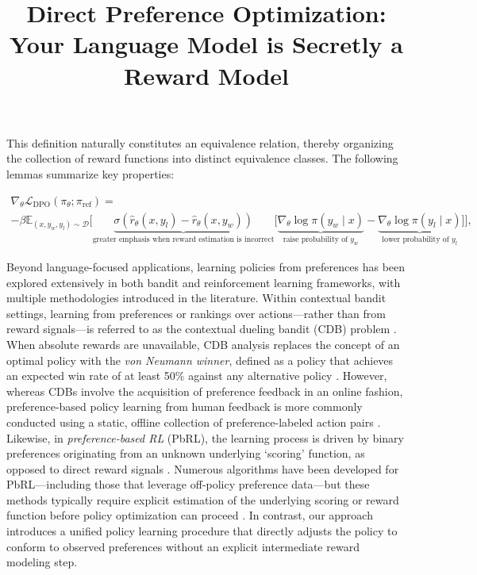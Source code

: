\title{Direct Preference Optimization: Your Language Model is Secretly a Reward Model}
This definition naturally constitutes an equivalence relation, thereby organizing the collection of reward functions into distinct equivalence classes. The following lemmas summarize key properties:

\begin{multline*}\label{eq:gradient}
    \nabla_\theta \mathcal{L}_\text{DPO}(\pi_\theta;\pi_\text{ref}) = \\ -\beta\mathbb{E}_{(x, y_w, y_l) \sim \mathcal{D}} \Bigg[\underbrace{\sigma(\hat{r}_\theta(x, y_l) - \hat{r}_\theta (x, y_w))}_\text{greater emphasis when reward estimation is incorrect}\Big[\underbrace{\nabla_\theta\log \pi(y_w \mid x)}_\text{raise probability of $y_w$} - \underbrace{\nabla_\theta\log\pi(y_l \mid x)}_\text{lower probability of $y_l$}\Big]\Bigg],
\end{multline*}

Beyond language-focused applications, learning policies from preferences has been explored extensively in both bandit and reinforcement learning frameworks, with multiple methodologies introduced in the literature. Within contextual bandit settings, learning from preferences or rankings over actions—rather than from reward signals—is referred to as the contextual dueling bandit (CDB) problem \citep{yue2012karmed,dudik2015contextual}. When absolute rewards are unavailable, CDB analysis replaces the concept of an optimal policy with the \textit{von Neumann winner}, defined as a policy that achieves an expected win rate of at least 50\% against any alternative policy \citep{dudik2015contextual}. However, whereas CDBs involve the acquisition of preference feedback in an online fashion, preference-based policy learning from human feedback is more commonly conducted using a static, offline collection of preference-labeled action pairs \citep{yan2022human}. Likewise, in \textit{preference-based RL} (PbRL), the learning process is driven by binary preferences originating from an unknown underlying `scoring' function, as opposed to direct reward signals \citep{BusaFekete2014,ruiz2023dueling}. Numerous algorithms have been developed for PbRL—including those that leverage off-policy preference data—but these methods typically require explicit estimation of the underlying scoring or reward function before policy optimization can proceed \citep{jain2013learning,BusaFekete2014,christiano2017deep,sadigh2017active,kupcsik2018learning}. In contrast, our approach introduces a unified policy learning procedure that directly adjusts the policy to conform to observed preferences without an explicit intermediate reward modeling step.

